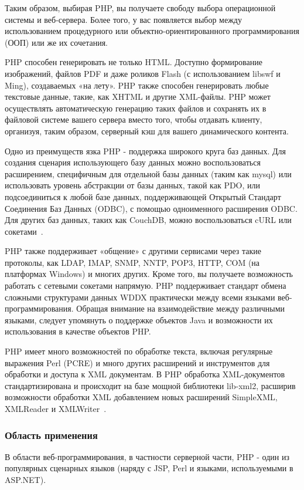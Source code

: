 Таким образом, выбирая PHP, вы получаете свободу выбора операционной системы и веб-сервера. Более того, у вас появляется выбор между использованием процедурного или объектно-ориентированного программирования (ООП) или же их сочетания.

PHP способен генерировать не только HTML. Доступно формирование изображений, файлов PDF и даже роликов Flash (с использованием libswf и Ming), создаваемых «на лету». PHP также способен генерировать любые текстовые данные, такие, как XHTML и другие XML-файлы. PHP может осуществлять автоматическую генерацию таких файлов и сохранять их в файловой системе вашего сервера вместо того, чтобы отдавать клиенту, организуя, таким образом, серверный кэш для вашего динамического контента.

Одно из преимуществ язка PHP - поддержка широкого круга баз данных. Для создания сценария использующего базу данных можно воспользоваться расширением, специфичным для отдельной базы данных (таким как mysql) или использовать уровень абстракции от базы данных, такой как PDO, или подсоединиться к любой базе данных, поддерживающей Открытый Стандарт Соединения Баз Данных (ODBC), с помощью одноименного расширения ODBC. Для других баз данных, таких как CouchDB, можно воспользоваться cURL или сокетами~\cite{php_documents}.

PHP также поддерживает «общение» с другими сервисами через такие протоколы, как LDAP, IMAP, SNMP, NNTP, POP3, HTTP, COM (на платформах Windows) и многих других. Кроме того, вы получаете возможность работать с сетевыми сокетами напрямую. PHP поддерживает стандарт обмена сложными структурами данных WDDX практически между всеми языками веб-программирования. Обращая внимание на взаимодействие между различными языками, следует упомянуть о поддержке объектов Java и возможности их использования в качестве объектов PHP.

PHP имеет много возможностей по обработке текста, включая регулярные выражения Perl (PCRE) и много других расширений и инструментов для обработки и доступа к XML документам. В PHP обработка XML-документов стандартизирована и происходит на базе мощной библиотеки lib-xml2, расширив возможности обработки XML добавлением новых расширений SimpleXML, XMLReader и XMLWriter~\cite{php_documents}.

\subsubsection{Область применения }
\label{sub:practice:whereis_php}
В области веб-программирования, в частности серверной части, PHP - один из популярных сценарных языков (наряду с JSP, Perl и языками, используемыми в ASP.NET).

